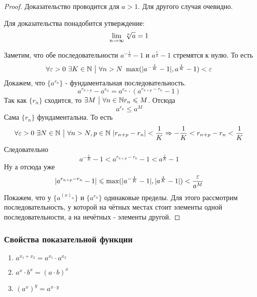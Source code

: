 \begin{proof}
	Доказательство проводится для $a > 1$. Для другого случая очевидно.
	
	Для доказательства понадобится утверждение:
	$$
		\lim\limits_{n \to \infty} \sqrt[n]{a} = 1
	$$
	
	Заметим, что обе последовательности $a^{-\frac{1}{n}} - 1$ и $a^{\frac{1}{n}} - 1$ стремятся к нулю. То есть
	$$
		\forall \varepsilon > 0\ \exists K \in \mathbb{N} \ \big|\  \forall n > N\ \max(|a^{-\frac{1}{K}} - 1|, a^{\frac{1}{K}} - 1) < \varepsilon
	$$
	Докажем, что $\{a^{r_n}\}$ - фундаментальная последовательность.
	$$
		a^{r_{n + p}} - a^{r_n} = a^{r_n} \cdot (a^{r_{n + p} - r_n} - 1)
	$$
	Так как $\{r_n\}$ сходится, то $\exists M \ \big|\  \forall n \in \mathbb{N} r_n \leqslant M$. Отсюда
	$$
		a^{r_n} \le a^M
	$$
	Сама $\{r_n\}$ фундаментальна. То есть
	$$
		\forall \varepsilon > 0\ \exists N \in \mathbb{N} \ \big|\  \forall n > N, p \in \mathbb{N}\ |r_{n + p} - r_n| < \frac{1}{K} \Rightarrow -\frac{1}{K} < r_{n + p} - r_n < \frac{1}{K}
	$$
	Следовательно
	$$
		a^{-\frac{1}{K}} - 1 < a^{r_{n + p} - r_n} - 1 < a^{\frac{1}{K}} - 1
	$$
	Ну а отсюда уже
	$$
		|a^{r_{n + p} - r_n} - 1| \leqslant \max(|a^{-\frac{1}{K}} - 1|, |a^{\frac{1}{K}} - 1|) < \frac{\varepsilon}{a^M}
	$$
	Покажем, что у $\{a^{(x)_n}\}$ и $\{a^{r_n}\}$ одинаковые пределы. Для этого рассмотрим последовательность, у которой на чётных местах стоит элементы одной последовательности, а на нечётных - элементы другой.
\end{proof}

\subsubsection*{Свойства показательной функции}

\begin{enumerate}
	\item $a^{x_1 + x_2} = a^{x_1} \cdot a^{x_2}$
	\item $a^x \cdot b^x = (a \cdot b)^x$
	\item $(a^x)^y = a^{x \cdot y}$
\end{enumerate}

